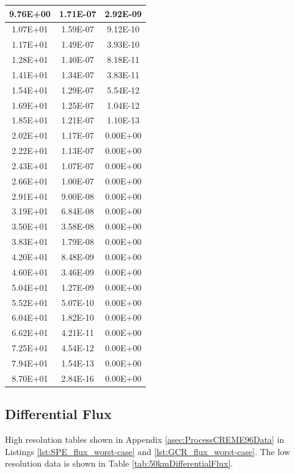 \documentclass{hitec}
\begin{document}
\begin{table}[h]
{\begin{tabular}{|c|c|c|}
			9.76E+00&	1.71E-07&	2.92E-09\\ \hline
			1.07E+01&	1.59E-07&	9.12E-10\\ \hline
			1.17E+01&	1.49E-07&	3.93E-10\\ \hline
			1.28E+01&	1.40E-07&	8.18E-11\\ \hline
			1.41E+01&	1.34E-07&	3.83E-11\\ \hline
			1.54E+01&	1.29E-07&	5.54E-12\\ \hline
			1.69E+01&	1.25E-07&	1.04E-12\\ \hline
			1.85E+01&	1.21E-07&	1.10E-13\\ \hline
			2.02E+01&	1.17E-07&	0.00E+00\\ \hline
			2.22E+01&	1.13E-07&	0.00E+00\\ \hline
			2.43E+01&	1.07E-07&	0.00E+00\\ \hline
			2.66E+01&	1.00E-07&	0.00E+00\\ \hline
			2.91E+01&	9.00E-08&	0.00E+00\\ \hline
			3.19E+01&	6.84E-08&	0.00E+00\\ \hline
			3.50E+01&	3.58E-08&	0.00E+00\\ \hline
			3.83E+01&	1.79E-08&	0.00E+00\\ \hline
			4.20E+01&	8.48E-09&	0.00E+00\\ \hline
			4.60E+01&	3.46E-09&	0.00E+00\\ \hline
			5.04E+01&	1.27E-09&	0.00E+00\\ \hline
			5.52E+01&	5.07E-10&	0.00E+00\\ \hline
			6.04E+01&	1.82E-10&	0.00E+00\\ \hline
			6.62E+01&	4.21E-11&	0.00E+00\\ \hline
			7.25E+01&	4.54E-12&	0.00E+00\\ \hline
			7.94E+01&	1.54E-13&	0.00E+00\\ \hline
			8.70E+01&	2.84E-16&	0.00E+00\\ \hline	
		\end{tabular}%
	}
\end{table}

\clearpage %



\subsection{Differential Flux}

High resolution tables shown in Appendix \ref{asec:ProcessCREME96Data} in Listings \ref{lst:SPE_flux_worst-case} and \ref{lst:GCR_flux_worst-case}. The low resolution data is shown in Table \ref{tab:50kmDifferentialFlux}.
\end{document}
